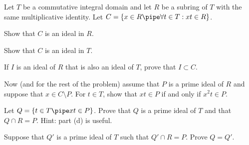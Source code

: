 Let $T$ be a commutative integral domain and let $R$ be a subring of
$T$ with the same multiplicative identity. Let $C=\{x\in R \pipe
\forall t\in T: xt\in R\}$.
\begin{alist}
\item Show that $C$ is an ideal in $R$.
\item Show that $C$ is an ideal in $T$.
\item If $I$ is an ideal of $R$ that is also an ideal of $T$,
prove that $I\subset C$.
\item Now (and for the rest of the problem) 
assume that $P$ is a prime ideal of $R$ and suppose that $x\in
C\setminus P$.  For $t\in T$, show that $xt\in P$ if and only if
$x^2t\in P$.
\item Let $Q=\{t\in T \pipe xt\in P\}$. Prove that $Q$ is a prime 
ideal of $T$ and that $Q\cap R=P$. Hint: part (d) is useful.
\item Suppose that $Q'$ is a prime ideal of $T$ such that $Q'\cap R=P$.
Prove $Q=Q'$.
\end{alist}
